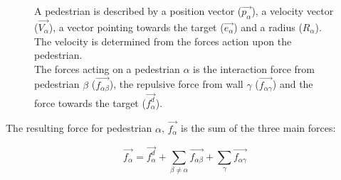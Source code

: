 \begin{figure}[ht]
    \centering
    \caption[Notation for pedestrians]{
     A pedestrian is described by a position
    vector ($ \overrightarrow{p_{\alpha}} $), a velocity vector ($
    \overrightarrow{V_{\alpha}} $), a vector pointing towards the target
    ($\overrightarrow{e_{\alpha}}$)  and a radius ($ R_{\alpha} $). The 
    velocity is determined from the forces action upon the pedestrian.\\
     The forces acting on a pedestrian $\alpha$ is the
    interaction force from pedestrian $\beta$
    ($\overrightarrow{f_{\alpha\beta}}$), the repulsive force from wall 
    $\gamma$
    ($\overrightarrow{f_{\alpha \gamma}}$) and the force towards the target 
    ($\overrightarrow{f^{d}_{\alpha}}$).}

    \label{pedestrian-notation}
\end{figure}

The resulting force for pedestrian $\alpha$, $\overrightarrow{f_{\alpha}}$ is
the sum of the three main forces:

\begin{equation}\label{model}
    \overrightarrow{f_{\alpha}} = \overrightarrow{f^{d}_{\alpha}} +
    \sum_{\beta \neq \alpha} \overrightarrow{f_{\alpha \beta}} +
    \sum_{\gamma} \overrightarrow{f_{\alpha \gamma}}
\end{equation}

